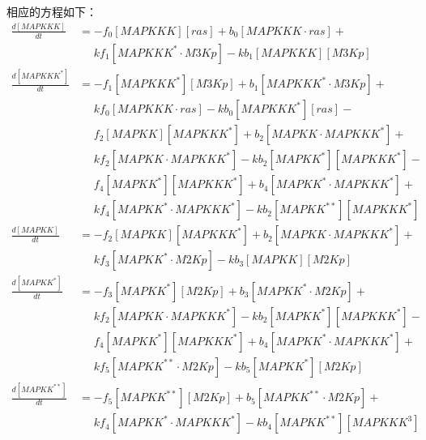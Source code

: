 相应的方程如下：
\small
\begin{equation*}
  \begin{align*}
    \frac{d[MAPKKK]}{dt} &= -f_{0}[MAPKKK][ras] + b_{0}[MAPKKK\cdot{}ras] +\\
    &\phantom{=} kf_{1}[MAPKKK^{*}\cdot{}M3Kp] - kb_{1}[MAPKKK][M3Kp]\\
    \frac{d[MAPKKK^{*}]}{dt} &= -f_{1}[MAPKKK^{*}][M3Kp] + b_{1}[MAPKKK^{*}\cdot{}M3Kp] +\\
    &\phantom{=} kf_{0}[MAPKKK\cdot{}ras] - kb_{0}[MAPKKK^{*}][ras] -\\
    &\phantom{=} f_{2}[MAPKK][MAPKKK^{*}] + b_{2}[MAPKK\cdot{}MAPKKK^{*}] +\\
    &\phantom{=} kf_{2}[MAPKK\cdot{}MAPKKK^{*}] - kb_{2}[MAPKK^{*}][MAPKKK^{*}] -\\
    &\phantom{=} f_{4}[MAPKK^{*}][MAPKKK^{*}] + b_{4}[MAPKK^{*}\cdot{}MAPKKK^{*}] +\\
    &\phantom{=} kf_{4}[MAPKK^{*}\cdot{}MAPKKK^{*}] - kb_{2}[MAPKK^{**}][MAPKKK^{*}]\\
    \frac{d[MAPKK]}{dt} &= -f_{2}[MAPKK][MAPKKK^{*}] + b_{2}[MAPKK\cdot{}MAPKKK^{*}] +\\
    &\phantom{=} kf_{3}[MAPKK^{*}\cdot{}M2Kp] - kb_{3}[MAPKK][M2Kp]\\
    \frac{d[MAPKK^{*}]}{dt} &= -f_{3}[MAPKK^{*}][M2Kp] + b_{3}[MAPKK^{*}\cdot{}M2Kp] +\\
    &\phantom{=} kf_{2}[MAPKK\cdot{}MAPKKK^{*}] - kb_{2}[MAPKK^{*}][MAPKKK^{*}] -\\
    &\phantom{=} f_{4}[MAPKK^{*}][MAPKKK^{*}] + b_{4}[MAPKK^{*}\cdot{}MAPKKK^{*}] +\\
    &\phantom{=} kf_{5}[MAPKK^{**}\cdot{}M2Kp] - kb_{5}[MAPKK^{*}][M2Kp]\\
    \frac{d[MAPKK^{**}]}{dt} &= -f_{5}[MAPKK^{**}][M2Kp] + b_{5}[MAPKK^{**}\cdot{}M2Kp] +\\
    &\phantom{=} kf_{4}[MAPKK^{*}\cdot{}MAPKKK^{*}] - kb_{4}[MAPKK^{**}][MAPKKK^{3}]\\
  \end{align*}
\end{equation*}
